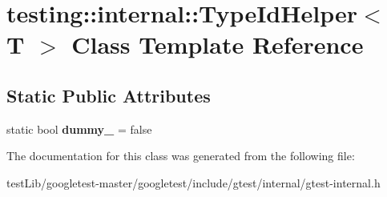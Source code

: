 \hypertarget{classtesting_1_1internal_1_1TypeIdHelper}{}\section{testing\+:\+:internal\+:\+:Type\+Id\+Helper$<$ T $>$ Class Template Reference}
\label{classtesting_1_1internal_1_1TypeIdHelper}
\subsection*{Static Public Attributes}
\begin{DoxyCompactItemize}
\item 
\mbox{\label{classtesting_1_1internal_1_1TypeIdHelper_a372268b1520d965d0bdf01ebad3d270e}} 
static bool {\bfseries dummy\+\_\+} = false
\end{DoxyCompactItemize}


The documentation for this class was generated from the following file\+:\begin{DoxyCompactItemize}
\item 
test\+Lib/googletest-\/master/googletest/include/gtest/internal/gtest-\/internal.\+h\end{DoxyCompactItemize}
